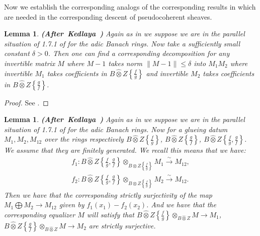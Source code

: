 \documentclass[12pt]{amsart}
\newtheorem{lemma}[theorem]{Lemma}
\theoremstyle{definition}
\numberwithin{equation}{section}
\begin{document}
\indent Now we establish the corresponding analogs of the corresponding results in \cite{Ked2} which are needed in the corresponding descent of pseudocoherent sheaves.



\begin{lemma}\mbox{\bf{(After Kedlaya \cite[Lemma 1.9.9]{Ked2})}}
Again as in \cite[Lemma 1.9.9]{Ked2} we suppose we are in the parallel situation of 1.7.1 of \cite[Lemma 1.9.9]{Ked2} for the adic Banach rings. Now take a sufficiently small constant $\delta>0$. Then one can find a corresponding decomposition for any invertible matrix $M$ where $M-1$ takes norm $\|M-1\|\leq \delta$ into $M_1M_2$ where invertible $M_1$ takes coefficients in $B\widehat{\otimes}Z\left\{\frac{f}{g}\right\}$ and invertible $M_2$ takes coefficients in $B\widehat{\otimes}Z\left\{\frac{g}{f}\right\}$. 
\end{lemma}


\begin{proof}
See \cite[Lemma 1.9.9]{Ked2}.	
\end{proof}


\begin{lemma}\mbox{\bf{(After Kedlaya \cite[Lemma 1.9.10]{Ked2})}}
Again as in \cite[Lemma 1.9.10]{Ked2} we suppose we are in the parallel situation of 1.7.1 of \cite[Lemma 1.9.10]{Ked2} for the adic Banach rings. Now for a glueing datum $M_1,M_2,M_{12}$ over the rings respectively $B\widehat{\otimes}Z\left\{\frac{f}{g}\right\}$, $B\widehat{\otimes}Z\left\{\frac{g}{f}\right\}$, $B\widehat{\otimes}Z\left\{\frac{f}{g},\frac{g}{f}\right\}$. We assume that they are finitely generated. We recall this means that we have:
\begin{align}
f_1: B\widehat{\otimes}Z\left\{\frac{f}{g},\frac{g}{f}\right\}\otimes_{B\widehat{\otimes}Z\left\{\frac{f}{g}\right\}}M_1\overset{\sim}{\rightarrow}M_{12},\\
f_2: B\widehat{\otimes}Z\left\{\frac{f}{g},\frac{g}{f}\right\}\otimes_{B\widehat{\otimes}Z\left\{\frac{f}{g}\right\}}M_2\overset{\sim}{\rightarrow}M_{12}.
\end{align}
Then we have that the corresponding strictly surjectivity of the map $M_1\bigoplus M_2\rightarrow M_{12}$ given by $f_1(x_1)-f_2(x_2)$. And we have that the corresponding equalizer $M$ will satisfy that $B\widehat{\otimes}Z\left\{\frac{f}{g}\right\} \otimes_{B\widehat{\otimes}Z}M\overset{}{\rightarrow}M_1$, $B\widehat{\otimes}Z\left\{\frac{g}{f}\right\}\otimes_{B\widehat{\otimes}Z}M\overset{}{\rightarrow}M_2$ are strictly surjective.	
\end{lemma}
\end{document}
